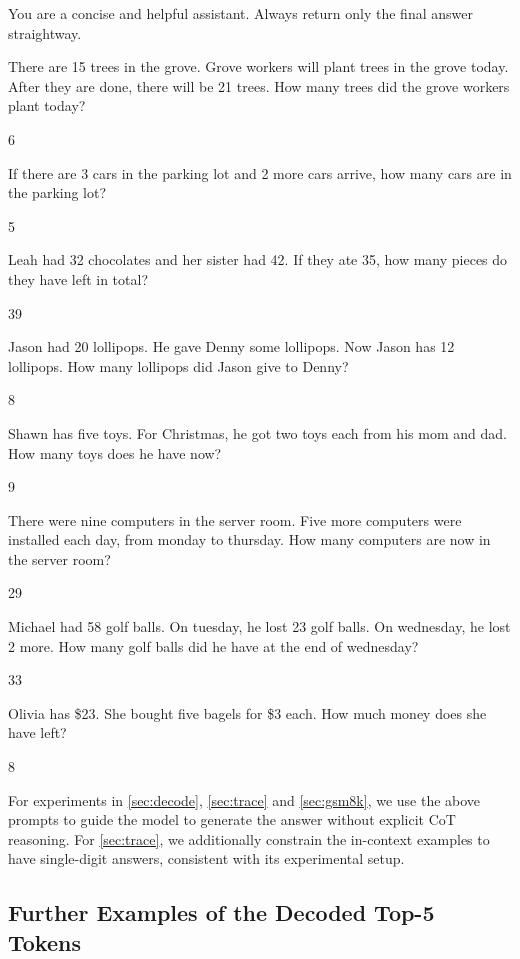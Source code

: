 \documentclass{article} %
\begin{document}
\begin{tcolorbox}[title=8-shot Prompt for \cref{sec:gsm8k}, listing only, listing options={
    basicstyle=\ttfamily\scriptsize,
    breaklines=true,
    showstringspaces=false,
    escapeinside=||,
    literate={<}{<}1 {>}{>}1 {|}{|}1 {_}{\_}1,
}]
You are a concise and helpful assistant. Always return only the final answer straightway.

There are 15 trees in the grove. Grove workers will plant trees in the grove today. After they are done, there will be 21 trees. How many trees did the grove workers plant today?

6

If there are 3 cars in the parking lot and 2 more cars arrive, how many cars are in the parking lot?

5

Leah had 32 chocolates and her sister had 42. If they ate 35, how many pieces do they have left in total?

39

Jason had 20 lollipops. He gave Denny some lollipops. Now Jason has 12 lollipops. How many lollipops did Jason give to Denny? 

8

Shawn has five toys. For Christmas, he got two toys each from his mom and dad. How many toys does he have now?

9

There were nine computers in the server room. Five more computers were installed each day, from monday to thursday. How many computers are now in the server room?

29

Michael had 58 golf balls. On tuesday, he lost 23 golf balls. On wednesday, he lost 2 more. How many golf balls did he have at the end of wednesday?

33

Olivia has \$23. She bought five bagels for \$3 each. How much money does she have left?

8
\end{tcolorbox}
For experiments in \cref{sec:decode}, \cref{sec:trace} and \cref{sec:gsm8k}, we use the above prompts to guide the model to generate the answer without explicit CoT reasoning. For \cref{sec:trace}, we additionally constrain the in-context examples to have single-digit answers, consistent with its experimental setup.

\subsection{Further Examples of the Decoded Top-5 Tokens}\label{app:examples}
\end{document}
